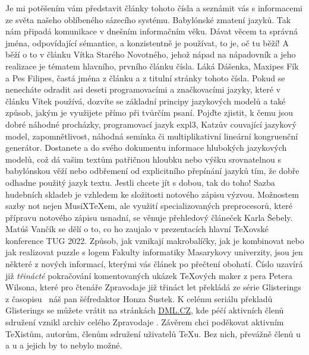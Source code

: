Je mi potěšením vám představit články tohoto čísla a seznámit vás s informacemi ze světa našeho oblíbeného sázecího systému.
Babylónské zmatení jazyků.  Tak nám připadá komunikace v dnešním informačním věku.  Dávat věcem ta správná jména, odpovídající sémantice, a konzistentně je používat, to je, oč tu běží!
A běží o to v článku Vítka Starého Novotného, jehož nápad na nápadovník a jeho realizace je tématem hlavního, prvního článku čísla. Láká Dášenka, Maxipes Fík a Pes Filipes, častá jména z článku a z titulní stránky tohoto čísla.  Pokud se ne\-necháte odradit asi deseti programovacími a značkovacími jazyky, které v článku Vítek používá, dozvíte se základní principy jazykových modelů a také způsob, jakým je využijete přímo při tvůrčím psaní.  Pojďte zjistit, k čemu jsou dobré náhodné procházky, programovací jazyk expl3, Katzův couvající jazykový model, zapomnětlivost, náhodná semínka či multi\-plikativní lineární kongruenční generátor.  Dostanete  a do svého dokumentu informace hlubokých jazykových modelů, což dá vašim textům patřičnou hloubku nebo výšku srovnatelnou s babylónskou věží nebo odbřemení od explicitního přepínání jazyků tím, že  dobře odhadne použitý jazyk textu.  Jestli chcete jít s dobou, tak do toho!
Sazba hudebních skladeb je vzhledem ke složitosti notového zápisu výzvou. Možnostem sazby not nejen MusiX\TeX em, ale využití specializovaných preprocesorů, které přípravu notového zápisu usnadní, se věnuje přehledový článeček Karla Šebely.
Matúš Vančík se dělí o to, co ho zaujalo v prezentacích hlavní \TeX ovské konference TUG 2022.  Způsob, jak vznikají makrobalíčky, jak je kombinovat nebo jak realizovat puzzle s logem Fakulty informatiky Masarykovy univerzity, jsou jen některé z nových informací, kterými vás článek po přečtení obohatí.
Číslo uzavírá již \emph{třinácté} pokračování komentovaných ukázek \TeX ových maker z pera Petera Wilsona, které pro čtenáře Zpravodaje již třináct let překládá ze série Glisterings z časopisu \TUGboat\ náš pan šéfredaktor Honza Šustek.
K {celému seriálu překladů Glisterings} se můžete vrátit na stránkách \href{https://dml.cz}{DML.CZ}, kde péčí aktivních členů sdružení \cite{tex:vrabcova2022,tex:NovotnyVH2021} vznikl archiv celého Zpravodaje \cite{tex:Zpravodaj}.
Závěrem chci poděkovat aktivním \TeX istům, autorům, členům sdružení uživatelů \TeX u.  Bez nich, převážně členů \CSTUG u a \TUG u a jejich  by to nebylo možné.
